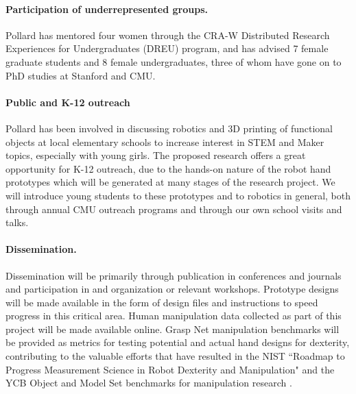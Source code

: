  \paragraph{Participation of underrepresented groups.}  Pollard has mentored four women through the CRA-W Distributed Research Experiences for Undergraduates (DREU) program, and has advised 7 female graduate students and 8 female undergraduates, three of whom have gone on to PhD studies at Stanford and CMU.

 \paragraph{Public and K-12 outreach}
Pollard has been involved in discussing robotics and 3D printing of functional objects at local elementary schools to increase interest in STEM and Maker topics, especially with young girls.  The proposed research offers a great opportunity for K-12 outreach, due to the hands-on nature of the robot hand prototypes which will be generated at many stages of the research project.   We will introduce young students to these prototypes and to robotics in general, both through annual CMU outreach programs and through our own school visits and talks.

 \paragraph{Dissemination.} 
 Dissemination will be primarily through publication in conferences and journals and participation in and organization or relevant workshops.    Prototype designs will be made available in the form of design files and instructions to speed progress in this critical area.   Human manipulation data collected as part of this project will be made available online.   Grasp Net manipulation benchmarks will be provided as metrics for testing potential and actual hand designs for dexterity, contributing to the valuable efforts that have resulted in the NIST ``Roadmap to Progress Measurement Science in Robot Dexterity and Manipulation" \cite{falco2014roadmap} and the YCB Object and Model Set benchmarks for manipulation research \cite{calli2015ycb}.

